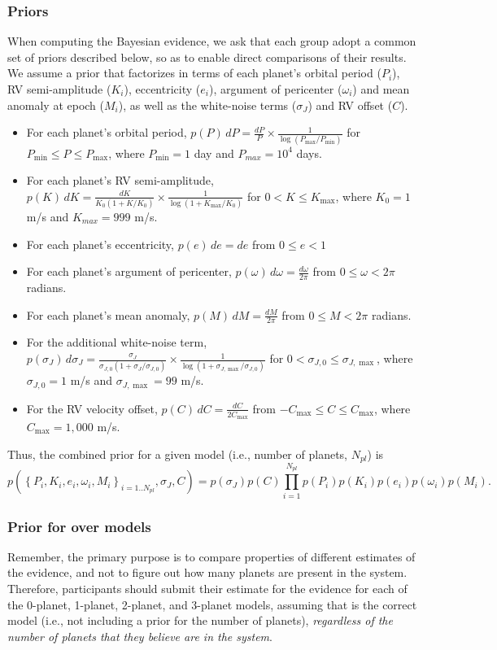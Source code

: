 \documentclass{article}
\begin{document}
\subsubsection{Priors}

When computing the Bayesian evidence, we ask that each group adopt a common set of priors described below, so as to enable direct comparisons of their results.  
We assume a prior that factorizes in terms of each planet's orbital period ($P_i$), RV semi-amplitude ($K_i$), eccentricity ($e_i$), argument of pericenter ($\omega_i$) and mean anomaly at epoch ($M_i$), as well as the white-noise terms ($\sigma_J$) and RV offset ($C$).
%
\begin{itemize}
\item For each planet's orbital period, $p(P) \, dP = \frac{dP}{P} \times  \frac{1}{\log(P_{\max}/P_{\min})}$ for $P_{\min} \le P \le P_{\max}$, where $P_{\min}=1$ day and $P_{max}=10^4$ days.
\item For each planet's RV semi-amplitude, $p(K) \, dK = \frac{dK}{K_0(1+K/K_0)} \times  \frac{1}{\log(1+K_{\max}/K_0)}$ for $0<K\le K_{\max}$, where $K_0=1$ m/s and $K_{max}=999$ m/s.
\item For each planet's eccentricity, $p(e) \, de = de$ from $0 \leq e < 1$
\item For each planet's argument of pericenter, $p(\omega) \, d\omega = \frac{d\omega}{2\pi}$ from $0 \leq \omega < 2\pi$ radians.
\item For each planet's mean anomaly, $p(M) \, dM = \frac{dM}{2\pi}$ from $0 \leq M < 2\pi$ radians.
\item For the additional white-noise term, $p(\sigma_J) \, d\sigma_J = \frac{\sigma_J}{\sigma_{J,0}(1+\sigma_J/\sigma_{J,0})} \times  \frac{1}{\log(1+\sigma_{J,\max}/\sigma_{J,0})}$ for $0<\sigma_{J,0} \le \sigma_{J,\max}$, where $\sigma_{J,0}=1$ m/s and $\sigma_{J,\max}=99$ m/s.
\item For the RV velocity offset, $p(C) \, dC = \frac{dC}{2C_{\max}}$ from $-C_{\max} \le C \le C_{\max}$, where $C_{\max} = 1,000$ m/s.
\end{itemize}
%
Thus, the combined prior for a given model (i.e., number of planets, $N_{pl}$) is
%
\begin{equation}
p\left(\left\{P_i,K_i,e_i,\omega_i,M_i\right\}_{i=1..N_{pl}}, \sigma_J, C \right) =
p(\sigma_J) p(C) \prod_{i=1}^{N_{pl}} p(P_i) p(K_i) p(e_i) p(\omega_i) p(M_i).
\end{equation}
%

\subsubsection{Prior for over models}
Remember, the primary purpose is to compare properties of different estimates of the evidence, and not to figure out how many planets are present in the system.  
Therefore, participants should submit their estimate for the evidence for each of the 0-planet, 1-planet, 2-planet, and 3-planet models, assuming that is the correct model (i.e., not including a prior for the number of planets), {\em regardless of the number of planets that they believe are in the system}.  
\end{document}
